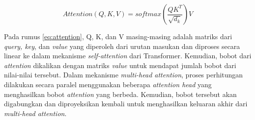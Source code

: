 \begin{equation}
    Attention(Q, K, V) = softmax(\frac{QK^{T}}{\sqrt{d_k}})V
    \label{eq:attention}
\end{equation}

Pada rumus \ref{eq:attention}, Q, K, dan V masing-masing adalah matriks dari \textit{query, key}, dan \textit{value} yang diperoleh dari urutan masukan dan diproses secara linear ke dalam mekanisme \textit{self-attention} dari Transformer. Kemudian, bobot dari \textit{attention} dikalikan dengan matriks \textit{value} untuk mendapat jumlah bobot dari nilai-nilai tersebut. Dalam mekanisme \textit{multi-head attention}, proses perhitungan dilakukan secara paralel menggunakan beberapa \textit{attention head} yang menghasilkan bobot \textit{attention} yang berbeda. Kemudian, bobot tersebut akan digabungkan dan diproyeksikan kembali untuk menghasilkan keluaran akhir dari \textit{multi-head attention}.
